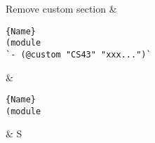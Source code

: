 Remove custom section
&  
        \vspace{-4mm}
\begin{lstlisting}[numbers=none]{Name}
(module
`- (@custom "CS43" "xxx...")`
        \end{lstlisting}   
& 
\begin{lstlisting}[numbers=none]{Name}
(module

        \end{lstlisting}   
&   S \\
\hline
